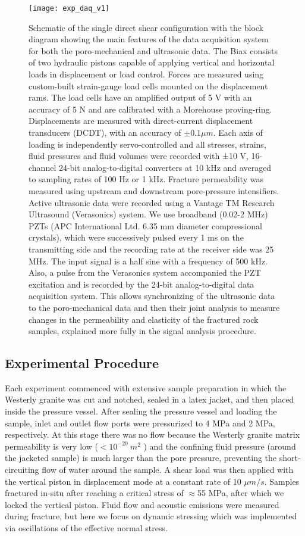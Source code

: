 \documentclass[draft]{agujournal2019}
\begin{document}
\begin{figure}[ht]
	\centering
	\texttt{[image: exp\_daq\_v1]}
	\caption[]{Schematic of the single direct shear configuration with the block diagram showing the main features of the data acquisition system for both the poro-mechanical and ultrasonic data. The Biax consists of two hydraulic pistons capable of applying vertical and horizontal loads in displacement or load control. Forces are measured using custom-built strain-gauge load cells mounted on the displacement rams. The load cells have an amplified output of 5 V with an accuracy of 5 N and are calibrated with a Morehouse proving-ring. Displacements are measured with direct-current displacement transducers (DCDT), with an accuracy of $\pm 0.1 \mu m$. Each axis of loading is independently servo-controlled and all stresses, strains, fluid pressures and fluid volumes were recorded with ±10 V, 16-channel 24-bit analog-to-digital converters at 10 kHz and averaged to sampling rates of 100 Hz or 1 kHz. Fracture permeability was measured using upstream and downstream pore-pressure intensifiers. Active ultrasonic data were recorded using a Vantage TM Research Ultrasound (Verasonics) system. We use broadband (0.02-2 MHz) PZTs (APC International Ltd. 6.35 mm diameter compressional crystals), which were successively pulsed every 1 ms on the transmitting side and the recording rate at the receiver side was 25 MHz. The input signal is a half sine with a frequency of 500 kHz. Also, a pulse from the Verasonics system accompanied the PZT excitation and is recorded by the 24-bit analog-to-digital data acquisition system. This allows synchronizing of the ultrasonic data to the poro-mechanical data and then their joint analysis to measure changes in the permeability and elasticity of the fractured rock samples, explained more fully in the signal analysis procedure.}
	\label{fig:data_aq}
\end{figure}

\newpage


\subsection{Experimental Procedure}

Each experiment commenced with extensive sample preparation in which the Westerly granite was cut and notched, sealed in a latex jacket, and then placed inside the pressure vessel. After sealing the pressure vessel and loading the sample, inlet and outlet flow ports were pressurized to 4 MPa and 2 MPa, respectively. At this stage there was no flow because the Westerly granite matrix permeability is very low ($< 10^{-20}\ m^2$ ) and the confining fluid pressure (around the jacketed sample) is much larger than the pore pressure, preventing the short-circuiting flow of water around the sample.
A shear load was then applied with the vertical piston in displacement mode at a constant rate of 10 $\mu m/s$. Samples fractured in-situ after reaching a critical stress of $ \approx $55 MPa, after which we locked the vertical piston. Fluid flow and acoustic emissions were measured during fracture, but here we focus on dynamic stressing which was implemented via oscillations of the effective normal stress.
\end{document}
